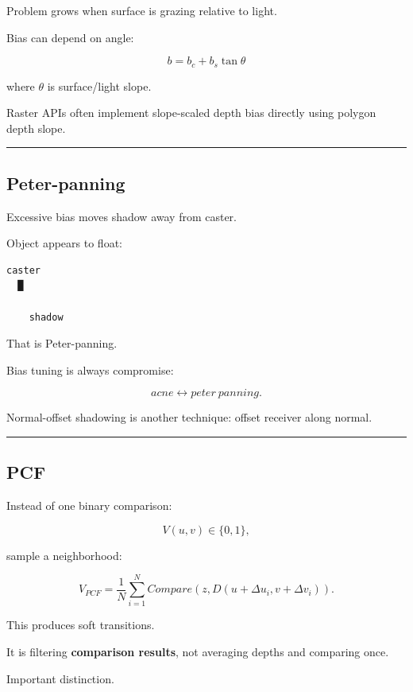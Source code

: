Problem grows when surface is grazing relative to light.

Bias can depend on angle:

\[
\boxed{
b=
b_c+
b_s\tan\theta
}
\]

where \(\theta\) is surface/light slope.

Raster APIs often implement slope-scaled depth bias directly using polygon depth slope.

\begin{center}\rule{0.5\linewidth}{0.5pt}\end{center}

\subsection{Peter-panning}\label{04-visual-computing-ii-ch040-peter-panning}

Excessive bias moves shadow away from caster.

Object appears to float:

\begin{verbatim}
caster
  █

    shadow
\end{verbatim}

That is Peter-panning.

Bias tuning is always compromise:

\[
acne
\leftrightarrow
peter\ panning.
\]

Normal-offset shadowing is another technique: offset receiver along normal.

\begin{center}\rule{0.5\linewidth}{0.5pt}\end{center}

\subsection{PCF}\label{04-visual-computing-ii-ch040-pcf}

Instead of one binary comparison:

\[
V(u,v)\in\{0,1\},
\]

sample a neighborhood:

\[
\boxed{
V_{PCF}
=
\frac1N
\sum_{i=1}^{N}
Compare(
z,
D(u+\Delta u_i,v+\Delta v_i)
).
}
\]

This produces soft transitions.

It is filtering \textbf{comparison results}, not averaging depths and comparing once.

Important distinction.

